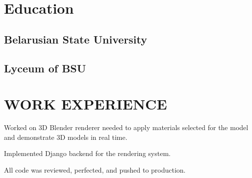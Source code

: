 \documentclass[]{deedy-resume-openfont}
\begin{document}


\begin{minipage}[t]{0.40\textwidth}

\section{Education}
\large
\subsection{Belarusian State University}
\sectionsep
\sectionsep

\subsection{Lyceum of BSU}



\end{minipage}
\hfill
\begin{minipage}[t]{0.59\textwidth}


\section{WORK EXPERIENCE}


\vspace{\topsep} %
\begin{tightemize}
\large
\item Worked on 3D Blender renderer needed to apply materials selected for the model and demonstrate 3D models in real time.
\item Implemented Django backend for the rendering system.
\item All code was reviewed, perfected, and pushed to production.
\end{tightemize}
\sectionsep


\end{minipage}

\vspace{\topsep}
\end{document}
